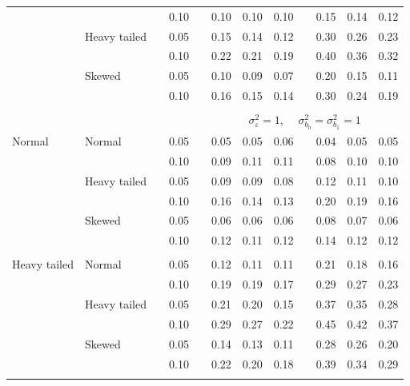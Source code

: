 \documentclass[12pt]{article} %
\begin{document}
\begin{table}[ht]
\begin{scriptsize}
\begin{center}
\begin{tabular}{ll p{.1cm} c p{.1cm} rrr p{.1cm} rrr}
             &              && 0.10 &&  0.10 & 0.10 & 0.10 && 0.15 & 0.14 & 0.12 \\ 
             & Heavy tailed && 0.05 &&  0.15 & 0.14 & 0.12 && 0.30 & 0.26 & 0.23 \\ 
             &              && 0.10 &&  0.22 & 0.21 & 0.19 && 0.40 & 0.36 & 0.32 \\ 
             & Skewed       && 0.05 &&  0.10 & 0.09 & 0.07 && 0.20 & 0.15 & 0.11 \\ 
             &              && 0.10 &&  0.16 & 0.15 & 0.14 && 0.30 & 0.24 & 0.19 \\ 

&&&&&&&&&&&\\
& && && \multicolumn{7}{c}{$\sigma_{\varepsilon}^2 = 1$, \ \ $\sigma_{b_0}^2 = \sigma_{b_1}^2 = 1$} \\ \cline{6-12}
\rowcolor{gray!20}Normal       & Normal       && 0.05 &&  0.05 & 0.05 & 0.06 && 0.04 & 0.05 & 0.05 \\ 
\rowcolor{gray!20}             &              && 0.10 &&  0.09 & 0.11 & 0.11 && 0.08 & 0.10 & 0.10 \\ 
\rowcolor{gray!20}             & Heavy tailed && 0.05 &&  0.09 & 0.09 & 0.08 && 0.12 & 0.11 & 0.10 \\ 
\rowcolor{gray!20}             &              && 0.10 &&  0.16 & 0.14 & 0.13 && 0.20 & 0.19 & 0.16 \\ 
\rowcolor{gray!20}             & Skewed       && 0.05 &&  0.06 & 0.06 & 0.06 && 0.08 & 0.07 & 0.06 \\ 
\rowcolor{gray!20}             &              && 0.10 &&  0.12 & 0.11 & 0.12 && 0.14 & 0.12 & 0.12 \\ 
             &&&&&&&&&&&\\
Heavy tailed & Normal       && 0.05 &&  0.12 & 0.11 & 0.11 && 0.21 & 0.18 & 0.16 \\ 
             &              && 0.10 &&  0.19 & 0.19 & 0.17 && 0.29 & 0.27 & 0.23 \\ 
             & Heavy tailed && 0.05 &&  0.21 & 0.20 & 0.15 && 0.37 & 0.35 & 0.28 \\ 
             &              && 0.10 &&  0.29 & 0.27 & 0.22 && 0.45 & 0.42 & 0.37 \\ 
             & Skewed       && 0.05 &&  0.14 & 0.13 & 0.11 && 0.28 & 0.26 & 0.20 \\ 
             &              && 0.10 &&  0.22 & 0.20 & 0.18 && 0.39 & 0.34 & 0.29 \\ 
             &&&&&&&&&&&\\

\end{tabular}
\end{center}
\end{scriptsize}
\end{table}
\end{document}
